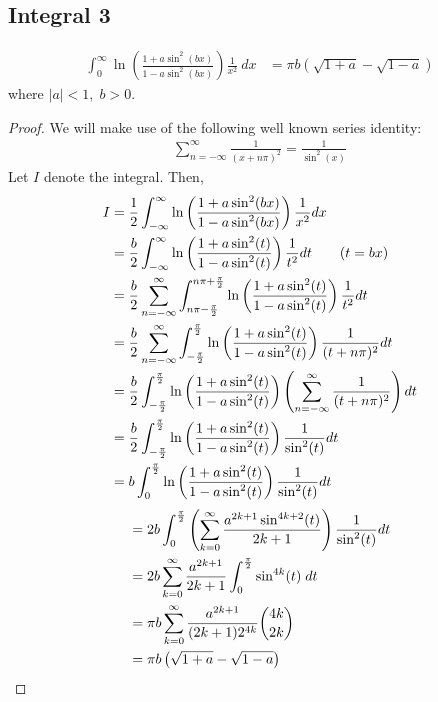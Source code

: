 \subsection{Integral 3}
\begin{align*}
 \int_{0}^{\infty} \ln \left(\frac{1+a \sin^{2} (bx)}{1-a \sin^{2} (bx)} \right) \frac{1}{x^{2}} \ dx &= \pi b \left( \sqrt{1+a} - \sqrt{1-a} \right)
\end{align*}
where $|a| < 1, \; b>0$.
\begin{proof}
We will make use of the following well known series identity:
\begin{align*}
\sum_{n=-\infty}^\infty \frac{1}{(x+n\pi)^2} = \frac{1}{\sin^2 (x)}
\end{align*}
Let $I$ denote the integral. Then,
\begin{align*}
I &= \frac{1}{2}\int_{-\infty}^\infty \ln \left(\frac{1+a \sin^{2} (bx)}{1-a \sin^{2} (bx)} \right)\frac{1}{x^2} dx \\
&=  \frac{b}{2}\int_{-\infty}^\infty \ln \left(\frac{1+a \sin^{2} (t)}{1-a \sin^{2} (t)} \right)\frac{1}{t^2} dt \quad \quad (t=bx) \\
&= \frac{b}{2}\sum_{n=-\infty}^\infty \int_{n\pi - \frac{\pi}{2}}^{n\pi + \frac{\pi}{2}}  \ln \left(\frac{1+a \sin^{2} (t)}{1-a \sin^{2} (t)} \right)\frac{1}{t^2} dt \\
&= \frac{b}{2}\sum_{n=-\infty}^\infty \int_{-{\pi\over 2}}^{\pi \over 2} \ln \left(\frac{1+a \sin^{2} (t)}{1-a \sin^{2} (t)} \right)\frac{1}{(t+n\pi)^2} dt \\
&= \frac{b}{2} \int_{-{\pi\over 2}}^{\pi\over 2} \ln \left(\frac{1+a \sin^{2} (t)}{1-a \sin^{2} (t)} \right)\left( \sum_{n=-\infty}^\infty \frac{1}{(t+n\pi)^2} \right) dt \\
&=  \frac{b}{2} \int_{-{\pi\over 2}}^{\pi\over 2} \ln \left(\frac{1+a \sin^{2} (t)}{1-a \sin^{2} (t)} \right)\frac{1}{\sin^2(t)} dt \\
&= b \int_0^{\pi\over 2} \ln \left(\frac{1+a \sin^{2} (t)}{1-a \sin^{2} (t)} \right)\frac{1}{\sin^2(t)} dt 
\end{align*}
\begin{align*}
&= 2b \int_0^{\pi \over 2}\left(\sum_{k=0}^\infty \frac{a^{2k+1}\sin^{4k+2}(t)}{2k+1} \right)\frac{1}{\sin^2(t)} dt \\
&= 2b\sum_{k=0}^\infty \frac{a^{2k+1}}{2k+1} \int_0^{\pi\over 2} \sin^{4k}(t)\; dt \\
&= \pi b\sum_{k=0}^\infty \frac{a^{2k+1}}{(2k+1) 2^{4k}} \binom{4k}{2k} \\
&= \pi b \left( \sqrt{1+a}-\sqrt{1-a}\right)
\end{align*}\end{proof}
